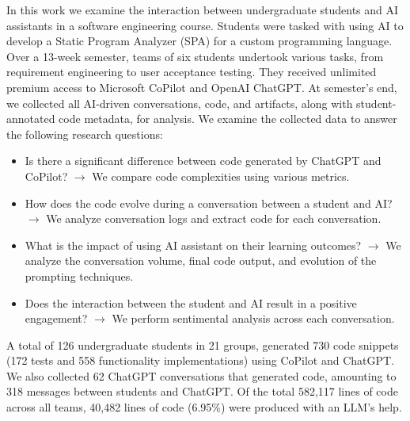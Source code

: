 In this work we examine the interaction between undergraduate students and AI assistants in a software engineering course. Students were tasked with using AI to develop a Static Program Analyzer (SPA) for a custom programming language. Over a 13-week semester, teams of six students undertook various tasks, from requirement engineering to user acceptance testing. They received unlimited premium access to Microsoft CoPilot and OpenAI ChatGPT. At semester's end, we collected all AI-driven conversations, code, and artifacts, along with student-annotated code metadata, for analysis. We examine the collected data to answer the following research questions:

\begin{itemize}
     \item Is there a significant difference between code generated by ChatGPT and CoPilot? $\rightarrow$ We compare code complexities using various metrics.
    \item How does the code evolve during a conversation between a student and AI? $\rightarrow$ We analyze conversation logs and extract code for each conversation. 
    \item What is the impact of using AI assistant on their learning outcomes? $\rightarrow$ We analyze the conversation volume, final code output, and evolution of the prompting techniques. 
    \item Does the interaction between the student and AI result in a positive engagement? $\rightarrow$ We perform sentimental analysis across each conversation. 
\end{itemize}

A total of 126 undergraduate students in 21 groups, generated 730 code snippets (172 tests and 558 functionality implementations) using CoPilot and ChatGPT. We also collected 62 ChatGPT conversations that generated code, amounting to 318 messages between students and ChatGPT. Of the total 582,117 lines of code across all teams, 40,482 lines of code (6.95\%) were produced with an LLM's help. 



